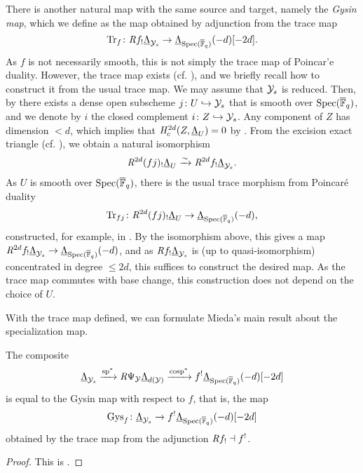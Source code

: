 \documentclass[../main.tex]{subfiles}
\begin{document}
There is another natural map with the same source and target, namely the 
\emph{Gysin map}, which we define as the map obtained by adjunction from the trace map
\begin{equation*}
  \operatorname{Tr}_f\colon \mathit R f_! \underline \Lambda_{\mathcal{Y}_s} \to \underline
  \Lambda_{\operatorname{Spec}({\overline {\mathbb{F}}_q})}(-d)[-2d].
\end{equation*}
As $f$ is not necessarily smooth, this is not
simply the trace map of Poincar'e duality. However, the trace map exists (cf. \cite[XVIII, Théorème 2.9]{SGA4}), and we briefly
recall how to construct it from the usual trace map. We may assume that $\mathcal{Y}_s$
is reduced. Then, by \cite[\href{https://stacks.math.columbia.edu/tag/056V}{Tag
056V}]{stacks-project} 
there exists a dense open subscheme $j \colon U \hookrightarrow \mathcal{Y}_s$ that is smooth over 
$\operatorname{Spec}({\overline {\mathbb{F}}_q})$, and we denote by $i$ the closed complement 
$i \colon Z \hookrightarrow \mathcal{Y}_s$. Any component of $Z$ has dimension $< d$, which implies that
$\mathit H^{2d}_c(Z, \underline \Lambda_U) = 0$ by \cite[Theorem 7.4.5]{LeiFuEtale}.
From the excision exact triangle (cf. \cite[Theorem 7.4.4 (iii)]{LeiFuEtale}),
we obtain a natural isomorphism
\begin{equation*}
  \mathit R^{2d} (fj)_! \underline \Lambda_U \xrightarrow{\sim} \mathit R^{2d} f_! \underline
  \Lambda_{\mathcal{Y}_s}.
\end{equation*}
As $U$ is smooth over $\operatorname{Spec}({\overline {\mathbb{F}}_q})$, there is the usual trace morphism from
Poincar\'e duality
\begin{equation*}
  \operatorname{Tr}_{fj}\colon \mathit R^{2d}(fj)_! \underline \Lambda_U \to \underline
  \Lambda_{\operatorname{Spec}({\overline {\mathbb{F}}_q})}(-d),
\end{equation*}
constructed, for example, in \cite[§8.2]{LeiFuEtale}. By the isomorphism
above, this gives a map $\mathit R^{2d} f_! \underline \Lambda_{\mathcal{Y}_s} \to \underline
\Lambda_{\operatorname{Spec}({\overline {\mathbb{F}}_q})}(-d)$, and as $\mathit R f_! \underline \Lambda_{\mathcal{Y}_s}$ is
(up to quasi-isomorphism) concentrated in degree $\leq 2d$, this suffices to
construct the desired map. As the trace map commutes with base change, this construction
does not depend on the choice of $U$.

With the trace map defined, we can formulate Mieda's main result about the
specialization map.
\begin{prop}\label{prop:MiedaFirstStepSpecMap}
  The composite 
  \begin{equation*}
    \underline{\Lambda}_{\mathcal{Y}_s} \xrightarrow{\mathrm{sp}^*} \mathit R \Psi_{\mathcal{Y}} \underline
    \Lambda_{d(\mathcal{Y})} \xrightarrow{\mathrm{cosp}^*} f^! \underline
    \Lambda_{\operatorname{Spec}({\overline {\mathbb{F}}_q})}(-d)[-2d]
  \end{equation*}
  is equal to the Gysin map with respect to $f$, that is, the map
  \begin{equation*}
    \mathrm{Gys}_f \colon \underline \Lambda_{\mathcal{Y}_s} \to f^! \underline
    \Lambda_{\operatorname{Spec}({\overline {\mathbb{F}}_q})}(-d)[-2d]
  \end{equation*}
  obtained by the trace map from the adjunction $\mathit R f_! \dashv f^!$.
  \begin{proof}
    This is \cite[Theorem 2.1]{mieda2016geometric}.
  \end{proof}
\end{prop}
\end{document}
